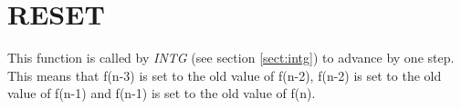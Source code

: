 \section{RESET}
\label{sect:reset}

\noindent This function is called by {\em INTG} (see section \ref{sect:intg})
to advance by one step. This means that f(n-3) is set to the old value of
f(n-2), f(n-2) is set to the old value of f(n-1) and f(n-1) is set to the old
value of f(n).\\
